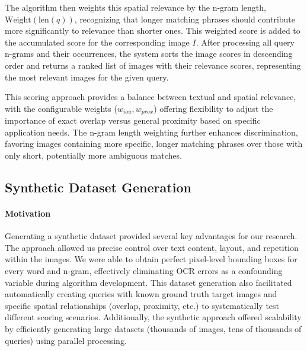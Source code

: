 \documentclass[manuscript,screen]{acmart}
\begin{document}
The algorithm then weights this spatial relevance by the n-gram length, $\text{Weight}(\text{len}(q))$, recognizing that longer matching phrases should contribute more significantly to relevance than shorter ones. This weighted score is added to the accumulated score for the corresponding image $I$. After processing all query n-grams and their occurrences, the system sorts the image scores in descending order and returns a ranked list of images with their relevance scores, representing the most relevant images for the given query.

This scoring approach provides a balance between textual and spatial relevance, with the configurable weights ($w_{iou}, w_{prox}$) offering flexibility to adjust the importance of exact overlap versus general proximity based on specific application needs. The n-gram length weighting further enhances discrimination, favoring images containing more specific, longer matching phrases over those with only short, potentially more ambiguous matches.

\subsection{Synthetic Dataset Generation}
\label{sec:synthetic_data}

\paragraph{Motivation} Generating a synthetic dataset provided several key advantages for our research. The approach allowed us precise control over text content, layout, and repetition within the images. We were able to obtain perfect pixel-level bounding boxes for every word and n-gram, effectively eliminating OCR errors as a confounding variable during algorithm development. This dataset generation also facilitated automatically creating queries with known ground truth target images and specific spatial relationships (overlap, proximity, etc.) to systematically test different scoring scenarios. Additionally, the synthetic approach offered scalability by efficiently generating large datasets (thousands of images, tens of thousands of queries) using parallel processing.
\end{document}
